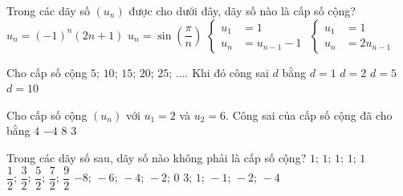 \begin{ex}%
	Trong các dãy số $(u_n)$ được cho dưới đây,  dãy số nào là cấp số cộng?
	 \choice
		{$u_n=(-1)^n(2n+1)$} 
		 {$u_n=\sin \left(\dfrac{\pi}{n}\right)$}
		{\True $\left\{\begin{aligned}
		 u_1&=1\\
		u_n  &=u_{n-1}-1
\end{aligned}\right.$}
{$\left\{\begin{aligned}
 u_1&=1\\
 u_n &=2u_{n-1}
\end{aligned}\right.$}
\end{ex}

\begin{ex}%
	Cho cấp số cộng $5$;  $10$; $15$; $20$; $25$; $\ldots$. Khi đó công sai $d$ bằng
	\choice 
		{$d=1$} 
		 {$d=2$}
		 {\True $d=5$}
		 {$d=10$}
\end{ex}

\begin{ex}%
	Cho cấp số cộng $(u_n)$ với $u_1=2$  và $u_2=6$. Công sai của cấp số cộng đã cho bằng
	\choice 
		{\True$4$} 
		 {$-4$}
		 {$8$}
		 {$3$}
\end{ex}

\begin{ex}%
	Trong  các dãy số sau, dãy số nào không phải là cấp số cộng?
	 \choice
		{ $1;\, 1;  \, 1; \, 1; \, 1$}
		{ $\dfrac{1}{2}; \, \dfrac{3}{2};  \, \dfrac{5}{2}; \, \dfrac{7}{2}; \, \dfrac{9}{2}$}
		{ $-8; \,-6; \,-4; \,-2;  \, 0$}
		{\True  $3; \, 1; \,-1; \,-2; \,-4$}
\end{ex}


